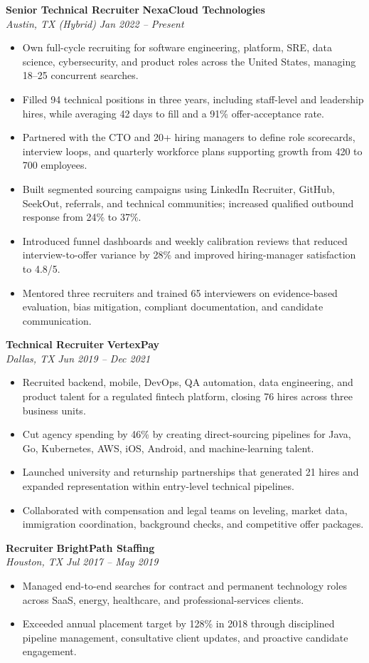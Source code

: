 \documentclass[10pt,letterpaper]{article}
\newcommand{\role}[4]{%
  \textbf{#1} \hfill \textbf{#2}\\[-0.05em]
  \textit{#3} \hfill \textit{#4}\vspace{-0.15em}
}
\begin{document}
\role{Senior Technical Recruiter}{NexaCloud Technologies}{Austin, TX (Hybrid)}{Jan 2022 -- Present}
\begin{itemize}
  \item Own full-cycle recruiting for software engineering, platform, SRE, data science, cybersecurity, and product roles across the United States, managing 18--25 concurrent searches.
  \item Filled 94 technical positions in three years, including staff-level and leadership hires, while averaging 42 days to fill and a 91\% offer-acceptance rate.
  \item Partnered with the CTO and 20+ hiring managers to define role scorecards, interview loops, and quarterly workforce plans supporting growth from 420 to 700 employees.
  \item Built segmented sourcing campaigns using LinkedIn Recruiter, GitHub, SeekOut, referrals, and technical communities; increased qualified outbound response from 24\% to 37\%.
  \item Introduced funnel dashboards and weekly calibration reviews that reduced interview-to-offer variance by 28\% and improved hiring-manager satisfaction to 4.8/5.
  \item Mentored three recruiters and trained 65 interviewers on evidence-based evaluation, bias mitigation, compliant documentation, and candidate communication.
\end{itemize}

\role{Technical Recruiter}{VertexPay}{Dallas, TX}{Jun 2019 -- Dec 2021}
\begin{itemize}
  \item Recruited backend, mobile, DevOps, QA automation, data engineering, and product talent for a regulated fintech platform, closing 76 hires across three business units.
  \item Cut agency spending by 46\% by creating direct-sourcing pipelines for Java, Go, Kubernetes, AWS, iOS, Android, and machine-learning talent.
  \item Launched university and returnship partnerships that generated 21 hires and expanded representation within entry-level technical pipelines.
  \item Collaborated with compensation and legal teams on leveling, market data, immigration coordination, background checks, and competitive offer packages.
\end{itemize}

\role{Recruiter}{BrightPath Staffing}{Houston, TX}{Jul 2017 -- May 2019}
\begin{itemize}
  \item Managed end-to-end searches for contract and permanent technology roles across SaaS, energy, healthcare, and professional-services clients.
  \item Exceeded annual placement target by 128\% in 2018 through disciplined pipeline management, consultative client updates, and proactive candidate engagement.
\end{itemize}
\end{document}
